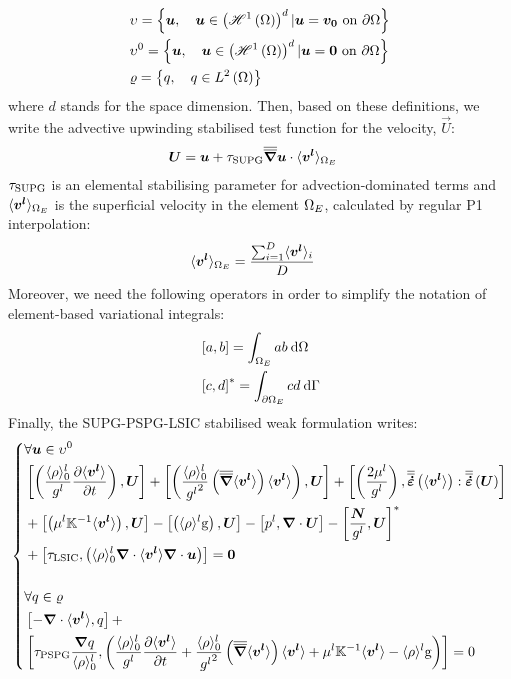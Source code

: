 \begin{align*}
& \upsilon = \left\{ \boldsymbol{u}, \quad \boldsymbol{u} \in \left( \mathscr{H}^1 \left( \Omega \right) \right)^d | \boldsymbol{u} = \boldsymbol{v_0} \text{ on } \partial \Omega  \right\} \\
& \upsilon^0 = \left\{ \boldsymbol{u}, \quad \boldsymbol{u} \in \left( \mathscr{H}^1 \left( \Omega \right) \right)^d | \boldsymbol{u} = \boldsymbol{0} \text{ on } \partial \Omega  \right\} \\
& \varrho = \left\{ q, \quad q \in L^2 \left( \Omega \right) \right\}
\end{align*}
where $d$ stands for the space dimension. Then, based on these definitions, we write the advective upwinding 
stabilised test function for the velocity, $\vec{U}$:
\begin{align}
\label{eq:supg_test}
& \vec{U} = \vec{u} + \tausupg \nabmat \vec{u} \cdot \vit_{\Ohm_E}
\end{align}
$\tau_\text{SUPG}$ is an elemental stabilising parameter for advection-dominated terms and $\langle \boldsymbol{v^l} \rangle_{\Omega_E}$
is the superficial velocity in the element ${\Omega_E}$, calculated by regular P1 interpolation:
\begin{align}
& \langle \boldsymbol{v^l} \rangle_{\Omega_E} = \frac{\sum_{i=1}^{D} \langle \boldsymbol{v^l} \rangle_{i}}{D}
\end{align}
Moreover, we need the following operators in order to simplify the notation of element-based variational integrals:
\begin{align}
& \left[ a,b \right] = \int_{\Omega_E} ab\: \mathrm{d}\Omega \\
& \left[ c,d \right]^{*} = \int_{\partial\Omega_E} cd\: \mathrm{d}\Gamma
\end{align}
Finally, the SUPG-PSPG-LSIC stabilised weak formulation writes:
\begin{equation}
	\label{eq:weakform_before}
   \left\{
   \begin{aligned}
      &\forall \vec{u} \in \upsilon^0 \\
	&\crochet{ \brac{\frac{\rhol_0}{\gl} \tempup{\vit}},\vec{U}} + 
	 \crochet{ \brac{\frac{\rhol_0}{\gl^2} \brac{\nabmat \vit} \vit},\vec{U}} + 
	 \crochet{\brac{\frac{2\mul}{\gl}}, \strainrate\brac{\vit}:\strainrate\brac{\vec{U}} } \\
	& + \crochet{\brac{\mul \K^{-1} \vit },\vec{U}}
	 - \crochet{\brac{\rhol \gravity},\vec{U}}
	 - \crochet{p^l,\nabvec \cdot \vec{U}}
	 - \crochet{\frac{\vec{N}}{\gl},\vec{U}}^{*} \\
	 & + \crochet{\taulsic, \brac{\rhol_0 \nabvec \cdot \vit \nabvec \cdot \vec{u} }} = \vec{0}\\ \\
	 &\forall q \in \varrho \\
	&\crochet{- \nabvec \cdot \vit, q} + \\
	&\crochet{\taupspg \frac{\nabvec q}{\rhol_0}, \brac{\frac{\rhol_0}{\gl} \tempup{\vit} 
	+ \frac{\rhol_0}{\gl^2} \brac{\nabmat \vit} \vit 
	+ \mul \K^{-1} \vit -\rhol \gravity}} = 0
    \end{aligned}
    \right.
\end{equation}

